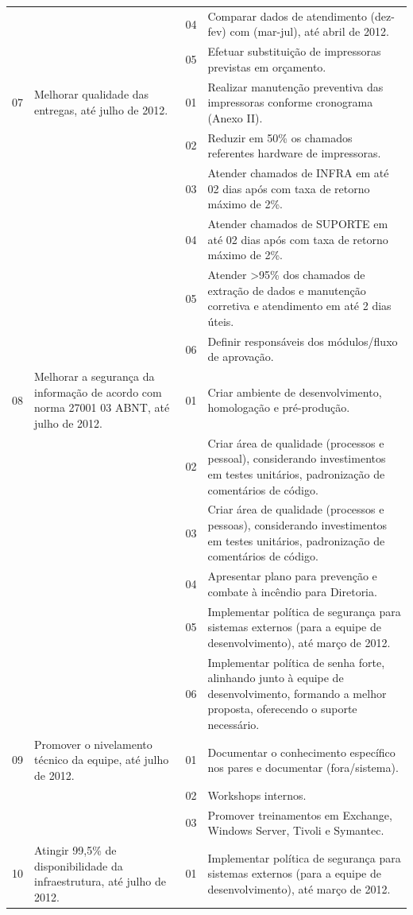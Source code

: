\documentclass{article}
\begin{document}
\begin{longtable}{|c|p{5cm}|c|p{8cm}|}
 & & 04 & Comparar dados de atendimento (dez-fev) com (mar-jul), até abril de 2012. \\
 & & 05 & Efetuar substituição de impressoras previstas em orçamento. \\
07 & Melhorar qualidade das entregas, até julho de 2012. & 01 & Realizar manutenção preventiva das impressoras conforme cronograma (Anexo II). \\
 & & 02 & Reduzir em 50\% os chamados referentes hardware de impressoras. \\
 & & 03 & Atender chamados de INFRA em até 02 dias após com taxa de retorno máximo de 2\%. \\
 & & 04 & Atender chamados de SUPORTE em até 02 dias após com taxa de retorno máximo de 2\%. \\
 & & 05 & Atender >95\% dos chamados de extração de dados e manutenção corretiva e atendimento em até 2 dias úteis. \\
 & & 06 & Definir responsáveis dos módulos/fluxo de aprovação. \\
08 & Melhorar a segurança da informação de acordo com norma 27001 03 ABNT, até julho de 2012. & 01 & Criar ambiente de desenvolvimento, homologação e pré-produção. \\
 & & 02 & Criar área de qualidade (processos e pessoal), considerando investimentos em testes unitários, padronização de comentários de código. \\
 & & 03 & Criar área de qualidade (processos e pessoas), considerando investimentos em testes unitários, padronização de comentários de código. \\
 & & 04 & Apresentar plano para prevenção e combate à incêndio para Diretoria. \\
 & & 05 & Implementar política de segurança para sistemas externos (para a equipe de desenvolvimento), até março de 2012. \\
 & & 06 & Implementar política de senha forte, alinhando junto à equipe de desenvolvimento, formando a melhor proposta, oferecendo o suporte necessário. \\
09 & Promover o nivelamento técnico da equipe, até julho de 2012. & 01 & Documentar o conhecimento específico nos pares e documentar (fora/sistema). \\
 & & 02 & Workshops internos. \\
 & & 03 & Promover treinamentos em Exchange, Windows Server, Tivoli e Symantec. \\
10 & Atingir 99,5\% de disponibilidade da infraestrutura, até julho de 2012. & 01 & Implementar política de segurança para sistemas externos (para a equipe de desenvolvimento), até março de 2012. \\

\end{longtable}
\end{document}
